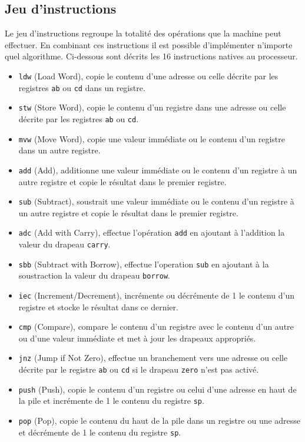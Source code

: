 \documentclass{article}
\begin{document}
\subsection{Jeu d'instructions}
Le jeu d'instructions regroupe la totalité des opérations que la machine peut effectuer. En combinant ces instructions il est possible d'implémenter n'importe quel algorithme. Ci-dessous sont décrits les 16 instructions natives au processeur.
\begin{itemize}
    \item \texttt{ldw} (Load Word), copie le contenu d'une adresse ou celle décrite par les registres \texttt{ab} ou \texttt{cd} dans un registre.
    \item \texttt{stw} (Store Word), copie le contenu d'un registre dans une adresse ou celle décrite par les registres \texttt{ab} ou \texttt{cd}.
    \item \texttt{mvw} (Move Word), copie une valeur immédiate ou le contenu d'un registre dans un autre registre.
    \item \texttt{add} (Add), additionne une valeur immédiate ou le contenu d'un registre à un autre registre et copie le résultat dans le premier registre.
    \item \texttt{sub} (Subtract), soustrait une valeur immédiate ou le contenu d'un registre à un autre registre et copie le résultat dans le premier registre.
    \item \texttt{adc} (Add with Carry), effectue l'opération \texttt{add} en ajoutant à l'addition la valeur du drapeau \texttt{carry}.
    \item \texttt{sbb} (Subtract with Borrow), effectue l'operation \texttt{sub} en ajoutant à la soustraction la valeur du drapeau \texttt{borrow}.
    \item \texttt{iec} (Increment/Decrement), incrémente ou décrémente de 1 le contenu d'un registre et stocke le résultat dans ce dernier.
    \item \texttt{cmp} (Compare), compare le contenu d'un registre avec le contenu d'un autre ou d'une valeur immédiate et met à jour les drapeaux appropriés.
    \item \texttt{jnz} (Jump if Not Zero), effectue un branchement vers une adresse ou celle décrite par le registre \texttt{ab} ou \texttt{cd} si le drapeau \texttt{zero} n'est pas activé.
    \item \texttt{push} (Push), copie le contenu d'un registre ou celui d'une adresse en haut de la pile et incrémente de 1 le contenu du registre \texttt{sp}.
    \item \texttt{pop} (Pop), copie le contenu du haut de la pile dans un registre ou une adresse et décrémente de 1 le contenu du registre \texttt{sp}.

\end{itemize}
\end{document}
